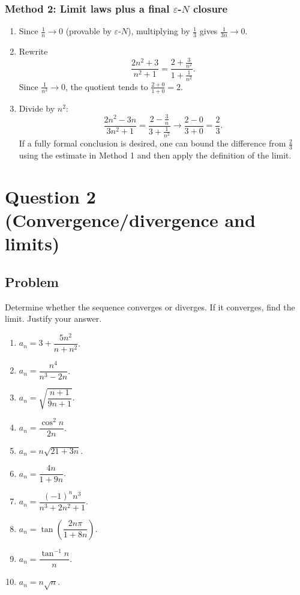 \documentclass[12pt]{article}
\begin{document}
\subsubsection*{Method 2: Limit laws plus a final \(\varepsilon\)-\(N\) closure}

\begin{enumerate}[label=(\alph*)]
\item Since \(\frac{1}{n}\to 0\) (provable by \(\varepsilon\)-\(N\)), multiplying by \(\frac{1}{3}\) gives \(\frac{1}{3n}\to 0\).

\item Rewrite
\[
\frac{2n^{2}+3}{n^{2}+1}
=\frac{2+\frac{3}{n^{2}}}{1+\frac{1}{n^{2}}}.
\]
Since \(\frac{1}{n^{2}}\to 0\), the quotient tends to \(\frac{2+0}{1+0}=2\).

\item Divide by \(n^{2}\):
\[
\frac{2n^{2}-3n}{3n^{2}+1}
=\frac{2-\frac{3}{n}}{3+\frac{1}{n^{2}}}
\to \frac{2-0}{3+0}=\frac{2}{3}.
\]
If a fully formal conclusion is desired, one can bound the difference from \(\frac{2}{3}\) using the estimate in Method 1 and then apply the definition of the limit.
\end{enumerate}

\newpage


\section*{Question 2 (Convergence/divergence and limits)}

\subsection*{Problem}
Determine whether the sequence converges or diverges. If it converges, find the limit. Justify your answer.
\begin{enumerate}[label=(\roman*)]
\item \(a_n = 3 + \dfrac{5n^{2}}{n+n^{2}}\).
\item \(a_n = \dfrac{n^{4}}{n^{3}-2n}\).
\item \(a_n = \sqrt{\dfrac{n+1}{9n+1}}\).
\item \(a_n = \dfrac{\cos^{2}n}{2n}\).
\item \(a_n = n\sqrt{21+3n}\).
\item \(a_n = \dfrac{4n}{1+9n}\).
\item \(a_n = \dfrac{(-1)^{n}n^{3}}{n^{3}+2n^{2}+1}\).
\item \(a_n = \tan\!\left(\dfrac{2n\pi}{1+8n}\right)\).
\item \(a_n = \dfrac{\tan^{-1}n}{n}\).
\item \(a_n = n\sqrt{n}\).
\end{enumerate}
\end{document}

